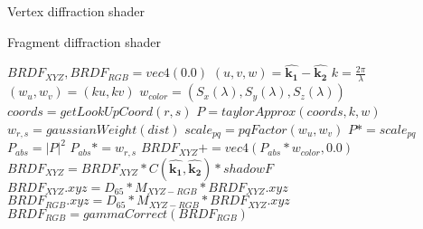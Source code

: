 \begin{algorithm}
  \caption{Vertex diffraction shader}
  \begin{algorithmic}
    \EndFor
  \end{algorithmic}
\end{algorithm}

\begin{algorithm}
  \caption{Fragment diffraction shader}
  \begin{algorithmic}
      \State $BRDF_{XYZ}, BRDF_{RGB} = vec4(0.0)$
      \State $(u,v,w) = \hat{\mathbf{k_1}}-\hat{\mathbf{k_2}}$
        \State $k = \frac{2\pi}{\lambda}$
        \State $(w_u, w_v) = (ku, kv)$
        \State $w_{color} = (S_x(\lambda), S_y(\lambda), S_z(\lambda))$
            \State $coords = getLookUpCoord(r, s)$
            \State $P = taylorApprox(coords, k, w)$
            \State $w_{r,s} = gaussianWeight(dist)$
            \State $scale_{pq} = pqFactor(w_u, w_v)$
            \State $P *= scale_{pq}$
            \State $P_{abs} = \left|P\right|^2$
            \State $P_{abs} *= w_{r,s}$
            \State $BRDF_{XYZ} += vec4(P_{abs}*w_{color}, 0.0)$
          \EndFor
        \EndFor
      \EndFor
      \State $BRDF_{XYZ} = BRDF_{XYZ}*C(\hat{\mathbf{k_1}},\hat{\mathbf{k_2}})*shadowF$
      \State $BRDF_{XYZ}.xyz = D_{65}*M_{XYZ-RGB}*BRDF_{XYZ}.xyz$
      \State $BRDF_{RGB}.xyz = D_{65}*M_{XYZ-RGB}*BRDF_{XYZ}.xyz$
      \State $BRDF_{RGB}= gammaCorrect(BRDF_{RGB})$
    \EndFor
  \end{algorithmic}
\end{algorithm}